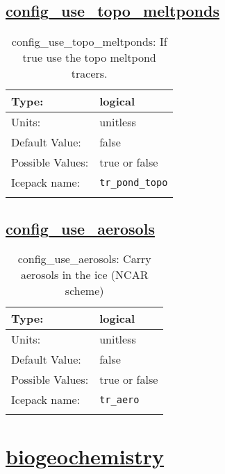 \subsection[config\_use\_topo\_meltponds]{\hyperref[sec:nm_tab_column_tracers]{config\_use\_topo\_meltponds}}
\label{subsec:nm_sec_config_use_topo_meltponds}
\begin{center}
\begin{longtable}{| p{2.0in} || p{4.0in} |}
    \hline
    Type: & logical \\
    \hline
    Units: & \si{unitless} \\
    \hline
    Default Value: & false \\
    \hline
    Possible Values: & true or false \\
    \hline
    \hline
    Icepack name: & \verb+tr_pond_topo+ \\
    \caption{config\_use\_topo\_meltponds: If true use the topo meltpond tracers.}
\end{longtable}
\end{center}
\subsection[config\_use\_aerosols]{\hyperref[sec:nm_tab_column_tracers]{config\_use\_aerosols}}
\label{subsec:nm_sec_config_use_aerosols}
\begin{center}
\begin{longtable}{| p{2.0in} || p{4.0in} |}
    \hline
    Type: & logical \\
    \hline
    Units: & \si{unitless} \\
    \hline
    Default Value: & false \\
    \hline
    Possible Values: & true or false \\
    \hline
    \hline
    Icepack name: & \verb+tr_aero+ \\
    \caption{config\_use\_aerosols: Carry aerosols in the ice (NCAR scheme)}
\end{longtable}
\end{center}
\section[biogeochemistry]{\hyperref[sec:nm_tab_biogeochemistry]{biogeochemistry}}
\label{sec:nm_sec_biogeochemistry}

